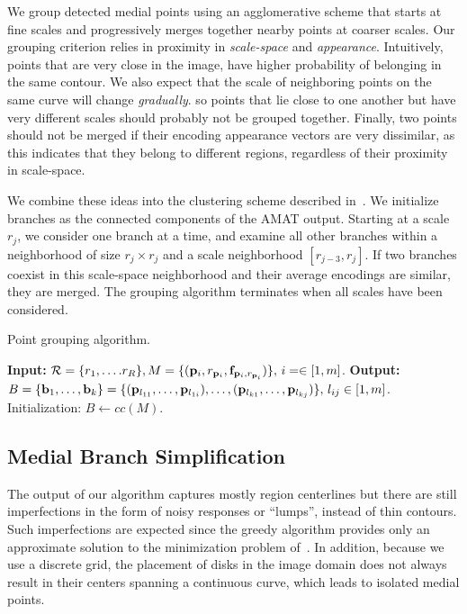 \documentclass[10pt,twocolumn,letterpaper]{article}
\begin{document}
We group detected medial points using an agglomerative scheme that starts at fine scales and
progressively merges together nearby points at coarser scales.
Our grouping criterion relies in proximity in \emph{scale-space} and \emph{appearance}.
Intuitively, points that are very close in the image, have higher probability of belonging in the
same contour.
We also expect that the scale of neighboring points on the same curve will change \emph{gradually}.
so points that lie close to one another but have very different scales should probably not be grouped together.
Finally, two points should not be merged if their encoding appearance vectors are very dissimilar,
as this indicates that they belong to different regions, regardless of their proximity in scale-space.

We combine these ideas into the clustering scheme described in~.
We initialize branches as the connected components of the AMAT output.
Starting at a scale $r_j$, we consider one branch at a time, and examine all other
branches within a neighborhood of size $r_j \times r_j$ and a scale neighborhood $[r_{j-3},r_j]$.
If two branches coexist in this scale-space neighborhood and their average encodings are similar,
they are merged.
The grouping algorithm terminates when all scales have been considered.

\begin{algorithm}[t]
\caption{Point grouping algorithm.}
\label{alg:grouping}
	\begin{algorithmic}[1]
	\Statex \textbf{Input:} $\set{R}=\{ r_1,\ldots.r_R \}, \newline M=\{ (\p{i},r_{\p{i}},\mathbf{f}_{\p{i},r_{\p{i}}}) \}, \, i=\in[1,m]$.
	\Statex \textbf{Output:} $B= \{ \mathbf{b}_1,\ldots,\mathbf{b}_k \} = \newline \{ (\p{l_{11}},\ldots,\p{l_{1i}}), \ldots, (\p{l_{k1}},\ldots,\p{l_{kj}}) \},\, l_{ij}\in[1,m]$.
	\State Initialization: $B \leftarrow cc(M)$. 
		\EndFor
	\EndFor
	\end{algorithmic}
\end{algorithm}


\subsection{Medial Branch Simplification}\label{sec:method:simplification}
The output of our algorithm captures mostly region centerlines but there are still
imperfections in the form of noisy responses or ``lumps'', instead of thin contours.
Such imperfections are expected since the greedy algorithm provides only an approximate solution
to the minimization problem of~. 
In addition, because we use a discrete grid, the placement of disks 
in the image domain does not always result in their centers spanning a continuous curve, 
which leads to isolated medial points.
\end{document}
